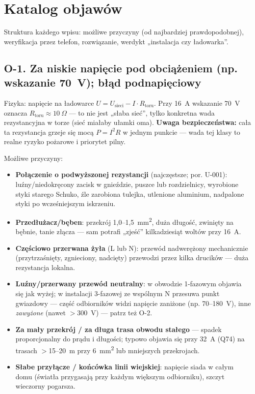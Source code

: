 \documentclass[11pt]{article}
\newcommand{\key}[1]{\textbf{\color{navy}#1}}
\newcommand{\warn}[1]{\textbf{\color{warnred}#1}}
\begin{document}
\section{Katalog objawów}\label{sec:katalog}
Struktura każdego wpisu: możliwe przyczyny (od najbardziej prawdopodobnej), weryfikacja przez telefon, rozwiązanie, werdykt „instalacja czy ładowarka''.

\subsection{O-1. Za niskie napięcie pod obciążeniem (np. wskazanie 70~V); błąd podnapięciowy}\label{o1}
Fizyka: napięcie na ładowarce $U = U_{\mathrm{sieci}} - I\cdot R_{\mathrm{toru}}$. Przy 16~A wskazanie 70~V oznacza $R_{\mathrm{toru}}\approx10~\Omega$ — to nie jest „słaba sieć'', tylko konkretna wada rezystancyjna w torze (sieć miałaby ułamki oma). \warn{Uwaga bezpieczeństwa:} cała ta rezystancja grzeje się mocą $P=I^2R$ w jednym punkcie — wada tej klasy to realne ryzyko pożarowe i priorytet pilny.

Możliwe przyczyny:
\begin{itemize}
\item \key{Połączenie o podwyższonej rezystancji} (najczęstsze; por. U-001): luźny/niedokręcony zacisk w gnieździe, puszce lub rozdzielnicy, wyrobione styki starego Schuko, źle zarobiona tulejka, utlenione aluminium, nadpalone styki po wcześniejszym iskrzeniu.
\item \key{Przedłużacz/bęben}: przekrój 1,0--1,5~mm\textsuperscript{2}, duża długość, zwinięty na bębnie, tanie złącza — sam potrafi „zjeść'' kilkadziesiąt woltów przy 16~A.
\item \key{Częściowo przerwana żyła} (L lub N): przewód nadwerężony mechanicznie (przytrzaśnięty, zgnieciony, nadcięty) przewodzi przez kilka drucików — duża rezystancja lokalna.
\item \key{Luźny/przerwany przewód neutralny}: w obwodzie 1-fazowym objawia się jak wyżej; w instalacji 3-fazowej ze wspólnym N przesuwa punkt gwiazdowy — część odbiorników widzi napięcie zaniżone (np. 70--180~V), inne \emph{zawyżone} (nawet $>$300~V) — patrz też O-2.
\item \key{Za mały przekrój / za długa trasa obwodu stałego} — spadek proporcjonalny do prądu i długości; typowo objawia się przy 32~A (Q74) na trasach $>$15--20~m przy 6~mm\textsuperscript{2} lub mniejszych przekrojach.
\item \key{Słabe przyłącze / końcówka linii wiejskiej}: napięcie siada w całym domu (światła przygasają przy każdym większym odbiorniku), szczyt wieczorny pogarsza.
\end{itemize}
\end{document}
